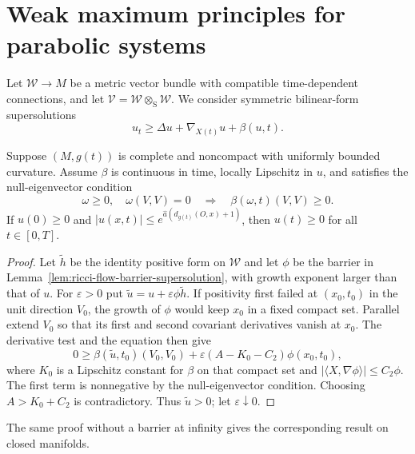 \section{Weak maximum principles for parabolic systems}

Let $\mathcal W\to M$ be a metric vector bundle with compatible
time-dependent connections, and let
$\mathcal V=\mathcal W\otimes_{\mathrm S}\mathcal W$.  We consider symmetric
bilinear-form supersolutions
\[
u_t\geq\Delta u+\nabla_{X(t)}u+\beta(u,t).
\]

\begin{proposition}
\label{prop:noncompact-system-preserves-nonnegativity}
Suppose $(M,g(t))$ is complete and noncompact with uniformly bounded
curvature.  Assume $\beta$ is continuous in time, locally Lipschitz in $u$,
and satisfies the null-eigenvector condition
\[
\omega\geq0,\quad \omega(V,V)=0
\quad\Longrightarrow\quad \beta(\omega,t)(V,V)\geq0.
\]
If $u(0)\geq0$ and
$|u(x,t)|\leq e^{\widehat a(d_{g(t)}(O,x)+1)}$, then $u(t)\geq0$ for all
$t\in[0,T]$.
\end{proposition}

\begin{proof}
Let $\widetilde h$ be the identity positive form on $\mathcal W$ and let
$\phi$ be the barrier in Lemma~\ref{lem:ricci-flow-barrier-supersolution},
with growth exponent larger than that of $u$.  For $\varepsilon>0$ put
$\widetilde u=u+\varepsilon\phi\widetilde h$.  If positivity first failed at
$(x_0,t_0)$ in the unit direction $V_0$, the growth of $\phi$ would keep
$x_0$ in a fixed compact set.  Parallel extend $V_0$ so that its first and
second covariant derivatives vanish at $x_0$.  The derivative test and the
equation then give
\[
0\geq \beta(\widetilde u,t_0)(V_0,V_0)
+\varepsilon(A-K_0-C_2)\phi(x_0,t_0),
\]
where $K_0$ is a Lipschitz constant for $\beta$ on that compact set and
$|\langle X,\nabla\phi\rangle|\leq C_2\phi$.  The first term is nonnegative
by the null-eigenvector condition.  Choosing $A>K_0+C_2$ is contradictory.
Thus $\widetilde u>0$; let $\varepsilon\downarrow0$.
\end{proof}

\begin{remark}
\label{rem:system-wmp-closed-manifolds}
The same proof without a barrier at infinity gives the corresponding result
on closed manifolds.
\end{remark}

